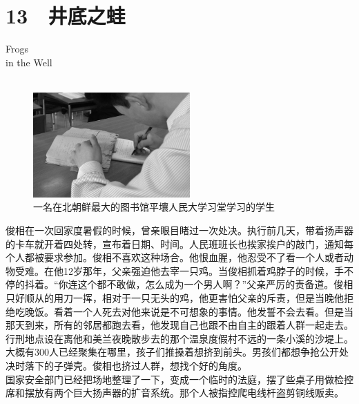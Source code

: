 \fancyhead[RO]{{\tiny{\textcolor{Gray}{\FA \ }}}\thepage}
\fancyhead[LE]{{\tiny{\textcolor{Gray}{\FA \ }}}\thepage}
\fancyfoot[LE,RO]{}
\fancyfoot[LO,CE]{}
\fancyfoot[CO,RE]{}
\chapter*{13 {\FA } 井底之蛙}
\vspace{5mm}
\begin{flushright}
	\textcolor{PinYinColor}{\EN \huge{Frogs\\
	in the Well\\
	\ \\}}
\end{flushright}
\begin{figure}[!htbp]
	\centering
	\includegraphics[width=6cm]{./Chapters/Images/13.jpg}
	\caption*{一名在北朝鲜最大的图书馆平壤人民大学习堂学习的学生}
\end{figure}


俊相在一次回家度暑假的时候，曾亲眼目睹过一次处决。执行前几天，带着扬声器的卡车就开着四处转，宣布着日期、时间。人民班班长也挨家挨户的敲门，通知每个人都被要求参加。俊相不喜欢这种场合。他恨血腥，他忍受不了看一个人或者动物受难。在他12岁那年，父亲强迫他去宰一只鸡。当俊相抓着鸡脖子的时候，手不停的抖着。“你连这个都不敢做，怎么成为一个男人啊？”父亲严厉的责备道。俊相只好顺从的用刀一挥，相对于一只无头的鸡，他更害怕父亲的斥责，但是当晚他拒绝吃晚饭。看着一个人死去对他来说是不可想象的事情。他发誓不会去看。但是当那天到来，所有的邻居都跑去看，他发现自己也跟不由自主的跟着人群一起走去。行刑地点设在离他和美兰夜晚散步去的那个温泉度假村不远的一条小溪的沙堤上。大概有300人已经聚集在哪里，孩子们推搡着想挤到前头。男孩们都想争抢公开处决时落下的子弹壳。俊相也挤过人群，想找个好的角度。\\

国家安全部门已经把场地整理了一下，变成一个临时的法庭，摆了些桌子用做检控席和摆放有两个巨大扬声器的扩音系统。那个人被指控爬电线杆盗剪铜线贩卖。\\

